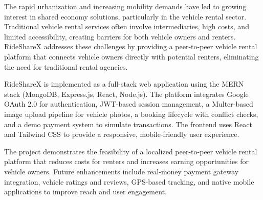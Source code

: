 The rapid urbanization and increasing mobility demands have led to growing interest in shared economy solutions, particularly in the vehicle rental sector. Traditional vehicle rental services often involve intermediaries, high costs, and limited accessibility, creating barriers for both vehicle owners and renters. RideShareX addresses these challenges by providing a peer-to-peer vehicle rental platform that connects vehicle owners directly with potential renters, eliminating the need for traditional rental agencies.

RideShareX is implemented as a full-stack web application using the MERN stack (MongoDB, Express.js, React, Node.js). The platform integrates Google OAuth 2.0 for authentication, JWT-based session management, a Multer-based image upload pipeline for vehicle photos, a booking lifecycle with conflict checks, and a demo payment system to simulate transactions. The frontend uses React and Tailwind CSS to provide a responsive, mobile-friendly user experience.

The project demonstrates the feasibility of a localized peer-to-peer vehicle rental platform that reduces costs for renters and increases earning opportunities for vehicle owners. Future enhancements include real-money payment gateway integration, vehicle ratings and reviews, GPS-based tracking, and native mobile applications to improve reach and user engagement.
